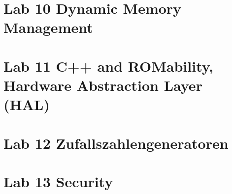 \documentclass[12pt]{article}
\begin{document}
\begin{small}
\section{Lab 10 Dynamic Memory Management}


\section{Lab 11 C++ and ROMability, Hardware Abstraction Layer (HAL)}


\section{Lab 12 Zufallszahlengeneratoren}


\section{Lab 13 Security}


\end{small}
\end{document}
